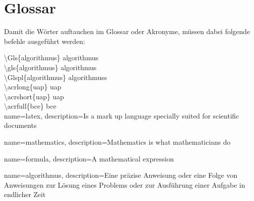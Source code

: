 \section{Glossar}

Damit die Wörter auftauchen im Glossar oder Akronyme, müssen dabei folgende befehle ausgeführt werden:

\textbackslash Gls\{algorithmus\} \Gls{algorithmus}     \\ 
\textbackslash gls\{algorithmus\} \gls{algorithmus}     \\
\textbackslash Glspl\{algorithmus\} \Glspl{algorithmus} \\

\textbackslash acrlong\{uap\} \acrlong{uap}     \\
\textbackslash acrshort\{uap\} \acrshort{uap}   \\
\textbackslash acrfull\{bce\} \acrfull{bce}     \\


{
        name=latex,
        description={Is a mark up language specially suited for 
scientific documents}
}

{
        name=mathematics,
        description={Mathematics is what mathematicians do}
}

{
        name=formula,
        description={A mathematical expression}
}

{
        name=algorithmus,
        description={Eine präzise Anweisung oder eine Folge von Anweisungen zur Lösung eines Problems oder zur Ausführung einer Aufgabe in endlicher Zeit}
}






\printglossaries